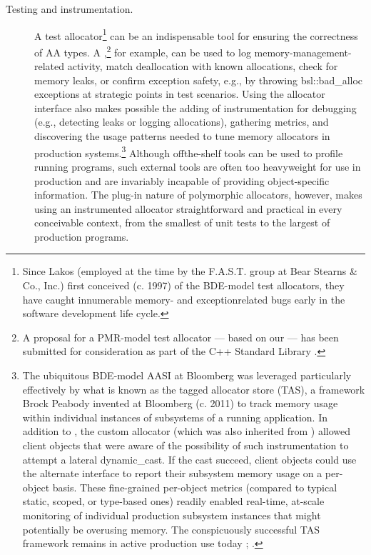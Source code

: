 \begin{description}
\item[Testing and instrumentation.] A test allocator\footnote{Since Lakos (employed at the time by the F.A.S.T. group at Bear Stearns \& Co., Inc.) first conceived
(c. 1997) of the BDE-model test allocators, they have caught innumerable memory- and exceptionrelated bugs
early in the software development life cycle.} can be an indispensable tool for
ensuring the correctness of AA types. A ,\footnote{A proposal for a PMR-model test allocator — based on our  — has been
submitted for consideration as part of the C++ Standard Library \cite{feher18}.} for example, can
be used to log memory-management-related activity, match deallocation with known
allocations, check for memory leaks, or confirm exception safety, e.g., by throwing
bsl::bad_alloc exceptions at strategic points in test scenarios. Using the allocator 
  interface also makes possible the adding of instrumentation for debugging (e.g.,
detecting leaks or logging allocations), gathering metrics, and discovering the usage
patterns needed to tune memory allocators in production
systems.\footnote{The ubiquitous BDE-model AASI at Bloomberg was leveraged particularly effectively by what is
known as the tagged allocator store (TAS), a framework Brock Peabody invented at Bloomberg (c.
2011) to track memory usage within individual instances of subsystems of a running application. In
addition to , the custom allocator (which was also inherited from
) allowed client objects that were aware of the possibility of such
instrumentation to attempt a lateral dynamic_cast. If the cast succeed, client objects could use the
alternate interface to report their subsystem memory usage on a per-object basis. These fine-grained
per-object metrics (compared to typical static, scoped, or type-based ones) readily enabled real-time,
at-scale monitoring of individual production subsystem instances that might potentially be overusing
memory. The conspicuously successful TAS framework remains in active production use today
\cite{halpern20a}; \cite{halpern20b}.} Although
offthe-shelf tools can be used to profile running programs, such external tools are
often too heavyweight for use in production and are invariably incapable of providing
object-specific information. The plug-in nature of polymorphic allocators, however,
makes using an instrumented allocator straightforward and practical in every
conceivable context, from the smallest of unit tests to the largest of production
programs.


\end{description}
